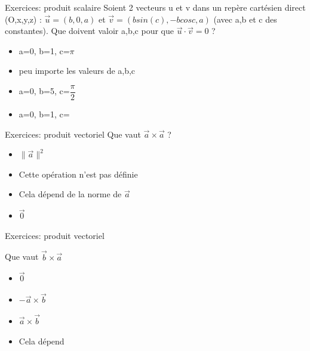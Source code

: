 \documentclass[xcolor=table]{beamer}
\begin{document}
\begin{frame}{Exercices: produit scalaire}
    Soient 2 vecteurs u et v dans un  repère cartésien direct (O,x,y,z) : $\Vec{u} = (b,0,a)$ et $\Vec{v} = (bsin(c),-bcosc,a)$ (avec a,b et c des constantes). Que doivent valoir a,b,c pour que $\Vec{u} \cdot \Vec{v} =0 $ ? 
    \begin{itemize}
        \item a=0, b=1, c=$\pi$  %
        \item peu importe les valeurs de a,b,c
        \item a=0, b=5, c=$\dfrac{\pi}{2}$
        \item a=0, b=1, c=
        
    \end{itemize}
\end{frame}

\begin{frame}{Exercices: produit vectoriel}
Que vaut $\Vec{a} \times \Vec{a}$ ?
    \begin{itemize}
        \item $ \lVert \Vec{a} \rVert ^2$
        \item Cette opération n'est pas définie
        \item Cela dépend de la norme de $\Vec{a}$
        \item $\Vec{0}$
    \end{itemize}
    
\end{frame}
\begin{frame}{Exercices: produit vectoriel}
    

Que vaut $\Vec{b} \times \Vec{a}$
    \begin{itemize}
        \item $\Vec{0}$
        \item $- \Vec{a} \times \Vec{b}$
        \item $\Vec{a} \times \Vec{b}$
        \item Cela dépend
    \end{itemize}
    \end{frame}
    
\end{document}
